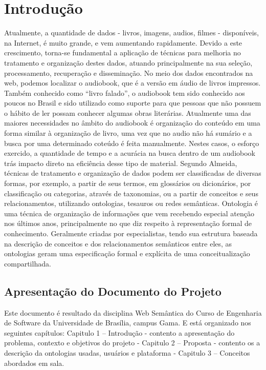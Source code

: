 \chapter[Introdução]{Introdução}\label{cap1}
		
Atualmente, a quantidade de dados - livros, imagens, audios, filmes - disponíveis, na Internet, é muito grande, e vem aumentando rapidamente. Devido a este crescimento, torna-se fundamental a aplicação de técnicas para melhoria no tratamento e organização destes dados, atuando principalmente na sua seleção, processamento, recuperação e disseminação.\cite{UVG}
No meio dos dados encontrados na web, podemos localizar o audiobook, que é a versão em áudio de livros impressos. Também conhecido como “livro falado”, o audiobook tem sido conhecido aos poucos no Brasil e sido utilizado como suporte para que pessoas que não possuem o hábito de ler possam conhecer algumas obras literárias.
Atualmente uma das maiores necessidades no âmbito do audiobook é organização do conteúdo em uma forma similar à organização de livro, uma vez que no audio não há sumário e a busca por uma determinado coteúdo é feita manualmente. Nestes casos, o esforço exercido, a quantidade de tempo e a acurácia na busca dentro de um audiobook trás impacto direto na eficiência desse tipo de material.
Segundo Almeida\cite{UVG}, técnicas de tratamento e organização de dados podem ser classificadas de diversas formas, por exemplo, a partir de seus termos, em glossários ou dicionários, por classificação ou categorias, através de taxonomias, ou a partir de conceitos e seus relacionamentos, utilizando ontologias, tesauros ou redes semânticas.\cite{TSW}
Ontologia é uma técnica de organização de informações que vem recebendo especial atenção nos últimos anos, principalmente no que diz respeito à representação formal de conhecimento. Geralmente criadas por especialistas, tendo sua estrutura baseada na descrição de conceitos e dos relacionamentos semânticos entre eles, as ontologias geram uma especificação formal e explícita de uma conceitualização compartilhada.


\section{Apresentação do Documento do Projeto}

Este documento é resultado da disciplina Web Semântica do Curso de Engenharia de Software da Universidade de Brasília, campus Gama. E está organizado nos seguintes capítulos: Capitulo 1 – Introdução - contento a apresentação do problema, contexto e objetivos do projeto -  Capitulo 2 – Proposta - contento os a descrição da ontologias usadas, usuários e plataforma - Capitulo 3 – Conceitos abordados em sala.

